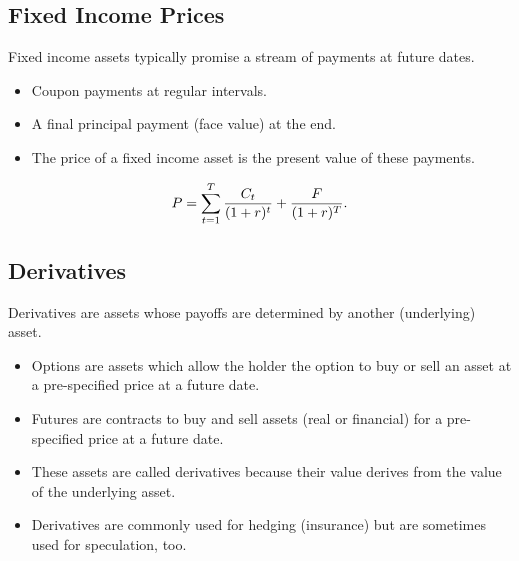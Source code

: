 \documentclass[letterpaper,10pt,english]{sphinxmanual}
\begin{document}
\subsection{Fixed Income Prices}
\label{assetClasses:fixed-income-prices}
Fixed income assets typically promise a stream of payments at future
dates.
\begin{itemize}
\item {} 
Coupon payments at regular intervals.

\end{itemize}
\begin{itemize}
\item {} 
A final principal payment (face value) at the end.

\end{itemize}
\begin{itemize}
\item {} 
The price of a fixed income asset is the present value of these
payments.

\end{itemize}
\begin{gather}
\begin{split}P = \sum_{t=1}^T \frac{C_t}{(1+r)^t} + \frac{F}{(1+r)^T}.\end{split}\notag
\end{gather}

\subsection{Derivatives}
\label{assetClasses:derivatives}
Derivatives are assets whose payoffs are determined by another
(underlying) asset.
\begin{itemize}
\item {} 
Options are assets which allow the holder the option to buy or sell
an asset at a pre-specified price at a future date.

\end{itemize}
\begin{itemize}
\item {} 
Futures are contracts to buy and sell assets (real or financial) for
a pre-specified price at a future date.

\end{itemize}
\begin{itemize}
\item {} 
These assets are called derivatives because their value derives from
the value of the underlying asset.

\end{itemize}
\begin{itemize}
\item {} 
Derivatives are commonly used for hedging (insurance) but are
sometimes used for speculation, too.

\end{itemize}
\end{document}
